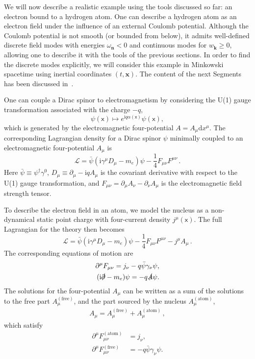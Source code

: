 \documentclass[letterpaper,12pt,titlepage,oneside,final]{book}
\newcommand{\mf}{\mathsf}%
\newcommand{\ii}{\mathrm{i}}
\begin{document}
We will now describe a realistic example using the tools discussed so far: an electron bound to a hydrogen atom. One can describe a hydrogen atom as an electron field under the influence of an external Coulomb potential. Although the Coulomb potential is not smooth (or bounded from below), it admits well-defined discrete field modes with energies $\omega_{\bm n}<0$ and continuous modes for $w_{\bm k}\geq 0$, allowing one to describe it with the tools of the previous sections. In order to find the discrete modes explicitly, we will consider this example in Minkowski spacetime using inertial coordinates $(t,\bm x)$. The content of the next Segments has been discussed in~\cite{ruhi}.


One can couple a Dirac spinor to electromagnetism by considering the U(1) gauge transformation associated with the charge $- q$,
\begin{equation}
    \psi(\mf x) \mapsto e^{\ii q\alpha(\mf x)} \psi(\mf x),
\end{equation}
which is generated by the electromagnetic four-potential $A = A_\mu \text{d}x^\mu$. The corresponding Lagrangian density for a Dirac spinor $\psi$ minimally coupled to an electromagnetic four-potential $A_\mu$ is
\begin{equation}\label{QED-lagrangian-density}
    \mathscr{L} = \bar{\psi}(\ii\gamma^\mu D_\mu - m_e)\psi  - \frac{1}{4} F_{\mu\nu}F^{\mu\nu}\, .
\end{equation}
Here $\bar{\psi} \equiv\psi^\dagger \gamma^0$, $D_\mu \equiv\partial_\mu - \ii q A_\mu$ is the covariant derivative with respect to the U(1) gauge transformation,  and \mbox{$F_{\mu\nu} = \partial_\mu A_\nu - \partial_\nu A_\mu$} is the electromagnetic field strength tensor.

To describe the electron field in an atom, we model the nucleus as a non-dynamical static point charge with four-current density $j^\mu(\mf x)$. The full Lagrangian for the theory then becomes
\begin{equation}\label{QED-lagrangian-density2}
    \mathscr{L} = \bar{\psi}(\ii\gamma^\mu D_\mu - m_e)\psi  - \frac{1}{4} F_{\mu\nu}F^{\mu\nu} - j^\mu A_\mu\, .
\end{equation}
The corresponding equations of motion are
\begin{align}
    \partial^\mu F_{\mu\nu} = j_\nu -q \bar{\psi}\gamma_\nu \psi,\\
    (\ii \slashed{\partial} - m_e)\psi = -q\slashed{A} \psi.
\end{align}
The solutions for the four-potential $A_\mu$ can be written as a sum of the solutions to the free part $A_\mu^{(\text{free})}$, and the part sourced by the nucleus $A^{(\text{atom})}_\mu$,
\begin{align}\label{eq:Adecomp}
    A_\mu = A_\mu^{(\text{free})} + A^{(\text{atom})}_\mu \,, 
\end{align}
which satisfy
\begin{align}
    \partial^\mu F^{(\text{atom})}_{\mu\nu} &= j_\nu,\\
    \partial^\mu F^{(\text{free})}_{\mu\nu} &= -q \bar{\psi}\gamma_\nu \psi. 
\end{align}
\end{document}
